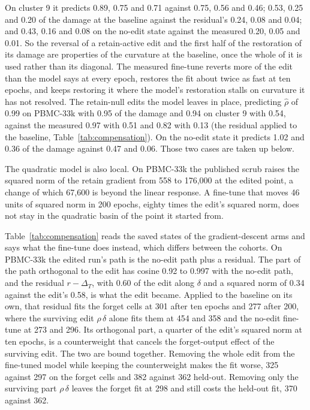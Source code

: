 \documentclass{article}
\begin{document}
On cluster 9 it predicts 0.89, 0.75 and 0.71 against 0.75, 0.56 and 0.46; 0.53, 0.25 and 0.20 of the damage at the baseline against the residual's 0.24, 0.08 and 0.04; and 0.43, 0.16 and 0.08 on the no-edit state against the measured 0.20, 0.05 and 0.01. So the reversal of a retain-active edit and the first half of the restoration of its damage are properties of the curvature at the baseline, once the whole of it is used rather than its diagonal. The measured fine-tune reverts more of the edit than the model says at every epoch, restores the fit about twice as fast at ten epochs, and keeps restoring it where the model's restoration stalls on curvature it has not resolved. The retain-null edits the model leaves in place, predicting $\hat\rho$ of 0.99 on PBMC-33k with 0.95 of the damage and 0.94 on cluster 9 with 0.54, against the measured 0.97 with 0.51 and 0.82 with 0.13 (the residual applied to the baseline, Table~\ref{tab:compensation}). On the no-edit state it predicts 1.02 and 0.36 of the damage against 0.47 and 0.06. Those two cases are taken up below.

The quadratic model is also local. On PBMC-33k the published scrub raises the squared norm of the retain gradient from 558 to 176,000 at the edited point, a change of which 67,600 is beyond the linear response. A fine-tune that moves 46 units of squared norm in 200 epochs, eighty times the edit's squared norm, does not stay in the quadratic basin of the point it started from.

Table~\ref{tab:compensation} reads the saved states of the gradient-descent arms and says what the fine-tune does instead, which differs between the cohorts. On PBMC-33k the edited run's path is the no-edit path plus a residual. The part of the path orthogonal to the edit has cosine 0.92 to 0.997 with the no-edit path, and the residual $r - \Delta_T$, with 0.60 of the edit along $\delta$ and a squared norm of 0.34 against the edit's 0.58, is what the edit became. Applied to the baseline on its own, that residual fits the forget cells at 301 after ten epochs and 277 after 200, where the surviving edit $\rho\,\delta$ alone fits them at 454 and 358 and the no-edit fine-tune at 273 and 296. Its orthogonal part, a quarter of the edit's squared norm at ten epochs, is a counterweight that cancels the forget-output effect of the surviving edit. The two are bound together. Removing the whole edit from the fine-tuned model while keeping the counterweight makes the fit worse, 325 against 297 on the forget cells and 382 against 362 held-out. Removing only the surviving part $\rho\,\delta$ leaves the forget fit at 298 and still costs the held-out fit, 370 against 362.
\end{document}
